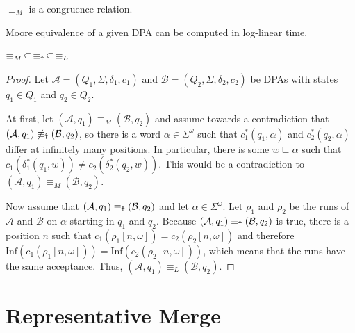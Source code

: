 \begin{cor}
	$\equiv_M$ is a congruence relation.
	\label{cor:general:M_congruence}
\end{cor}

\begin{cor}
	Moore equivalence of a given DPA can be computed in log-linear time.
	\label{cor:general:M_loglin}
\end{cor}


\vspace{10pt}

\begin{theorem}
	$\equiv_M \,\subseteq\, \equiv_\text{\Ankh} \,\subseteq\, \equiv_L$
	\label{thm:general:M_subs_Ankh_subs_L}
\end{theorem}

\begin{proof}
	Let $\mathcal{A} = (Q_1, \Sigma, \delta_1, c_1)$ and $\mathcal{B} = (Q_2, \Sigma, \delta_2, c_2)$ be DPAs with states $q_1 \in Q_1$ and $q_2 \in Q_2$. 
	
	At first, let $(\mathcal{A}, q_1) \equiv_M (\mathcal{B}, q_2)$ and assume towards a contradiction that $(\mathcal{A}, q_1) \not\equiv_\text{\Ankh} (\mathcal{B}, q_2)$, so there is a word $\alpha \in \Sigma^\omega$ such that $c_1^*(q_1, \alpha)$ and $c_2^*(q_2, \alpha)$ differ at infinitely many positions. In particular, there is some $w \sqsubseteq \alpha$ such that $c_1(\delta_1^*(q_1, w)) \neq c_2(\delta_2^*(q_2, w))$. This would be a contradiction to $(\mathcal{A}, q_1) \equiv_M (\mathcal{B}, q_2)$.
	
	Now assume that $(\mathcal{A}, q_1) \equiv_\text{\Ankh} (\mathcal{B}, q_2)$ and let $\alpha \in \Sigma^\omega$. Let $\rho_1$ and $\rho_2$ be the runs of $\mathcal{A}$ and $\mathcal{B}$ on $\alpha$ starting in $q_1$ and $q_2$. Because $(\mathcal{A}, q_1) \equiv_\text{\Ankh} (\mathcal{B}, q_2)$ is true, there is a position $n$ such that $c_1(\rho_1[n,\omega]) = c_2(\rho_2[n,\omega])$ and therefore $\text{Inf}(c_1(\rho_1[n,\omega])) = \text{Inf}(c_2(\rho_2[n,\omega]))$, which means that the runs have the same acceptance. Thus, $(\mathcal{A}, q_1) \equiv_L (\mathcal{B}, q_2)$.
\end{proof}






\section{Representative Merge}

